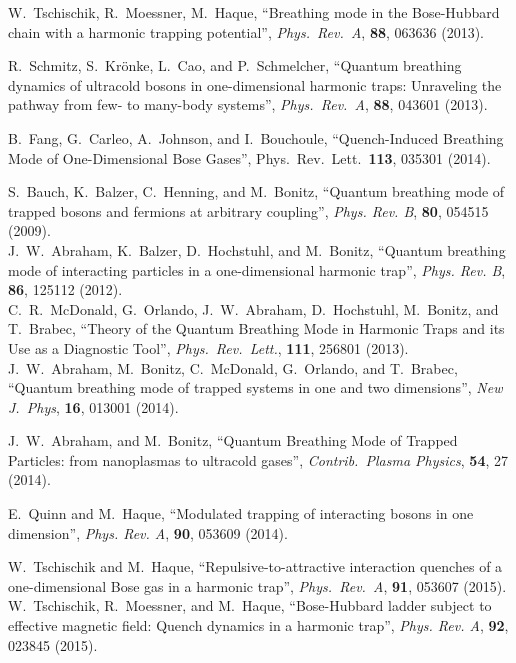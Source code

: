 \documentclass[a4paper, onecolumn]{revtex4-1}
\begin{document}
\begin{thebibliography}{1}
 W.~Tschischik, R.~Moessner, M.~Haque, 
``Breathing mode in the Bose-Hubbard chain with a harmonic trapping potential'', 
{\em Phys.\ Rev.~A}, \textbf{88}, 063636 (2013).

 R.~Schmitz, S.~Kr\"onke, L.~Cao, and 
  P.~Schmelcher, ``Quantum breathing dynamics of ultracold bosons in one-dimensional harmonic traps:
  Unraveling the pathway from few- to many-body systems'', 
{\em Phys.\ Rev.\ A}, \textbf{88}, 043601 (2013).

B.~Fang, G.~Carleo, A.~Johnson, and I.~Bouchoule,  
``Quench-Induced Breathing Mode of One-Dimensional Bose Gases'', 
Phys.\ Rev.\ Lett.\ \textbf{113}, 035301 (2014).   



%
S.~Bauch, K.~Balzer, C.~Henning, and M.~Bonitz, 
``Quantum breathing mode of trapped bosons and fermions at arbitrary coupling'', 
{\em Phys. Rev. B}, \textbf{80}, 054515 (2009).
%
\\
%
J.~W.~Abraham, K.~Balzer, D.~Hochstuhl, and M.~Bonitz, 
``Quantum breathing mode of interacting particles in a one-dimensional harmonic trap'', 
{\em Phys. Rev. B}, \textbf{86}, 125112 (2012).
%
\\
%
C.~R.~McDonald, G.~Orlando, J.~W.~Abraham, D.~Hochstuhl, M.~Bonitz, and T.~Brabec, 
``Theory of the Quantum Breathing Mode in Harmonic Traps and its Use as a Diagnostic Tool'', 
{\em Phys.\ Rev.\ Lett.}, \textbf{111}, 256801 (2013).
%
\\
%
J.~W.~Abraham, M.~Bonitz, C.~McDonald, G.~Orlando, and T.~Brabec, 
``Quantum breathing mode of trapped systems in one and two dimensions'', 
{\em New J.~Phys}, \textbf{16}, 013001 (2014).



 J.~W.~Abraham, and M.~Bonitz, ``Quantum Breathing Mode of Trapped Particles:
  from nanoplasmas to ultracold gases'', {\em Contrib.\ Plasma Physics}, \textbf{54}, 27
  (2014).


E.~Quinn and M.~Haque, 
``Modulated trapping of interacting bosons in one dimension'',  
{\em Phys. Rev. A}, {\bf 90}, 053609 (2014). 


 W.~Tschischik and M.~Haque, ``Repulsive-to-attractive interaction
  quenches of a one-dimensional Bose gas in a harmonic trap'', {\em Phys.\ Rev.~A}, \textbf{91},
  053607 (2015).
%
\\
% 
W.~Tschischik, R.~Moessner, and M.~Haque, ``Bose-Hubbard ladder
  subject to effective magnetic field: Quench dynamics in a harmonic trap'',
{\em Phys. Rev. A},  {\bf 92}, 023845 (2015). 



\end{thebibliography}
\end{document}
